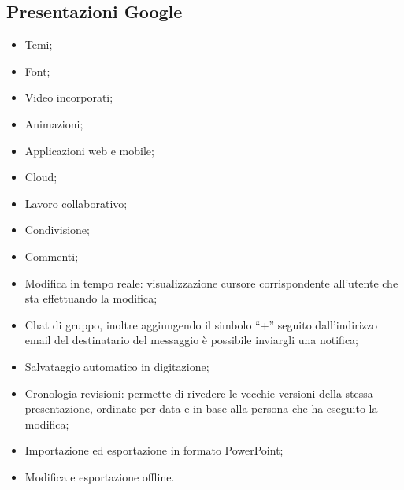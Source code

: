\subsection{Presentazioni Google}
\begin{itemize}
  \item Temi;
  \item Font;
  \item Video incorporati;
  \item Animazioni;
  \item Applicazioni web e mobile;
  \item Cloud;
  \item Lavoro collaborativo;
  \item Condivisione;
  \item Commenti;
  \item Modifica in tempo reale: visualizzazione cursore corrispondente all'utente che sta effettuando la modifica;
  \item Chat di gruppo, inoltre aggiungendo il simbolo ``+'' seguito dall'indirizzo email del destinatario del messaggio è possibile inviargli una notifica;
  \item Salvataggio automatico in digitazione;
  \item Cronologia revisioni: permette di rivedere le vecchie versioni della stessa presentazione, ordinate per data e in base alla persona che ha eseguito la modifica;
  \item Importazione ed esportazione in formato PowerPoint;
  \item Modifica e esportazione offline.
\end{itemize}
